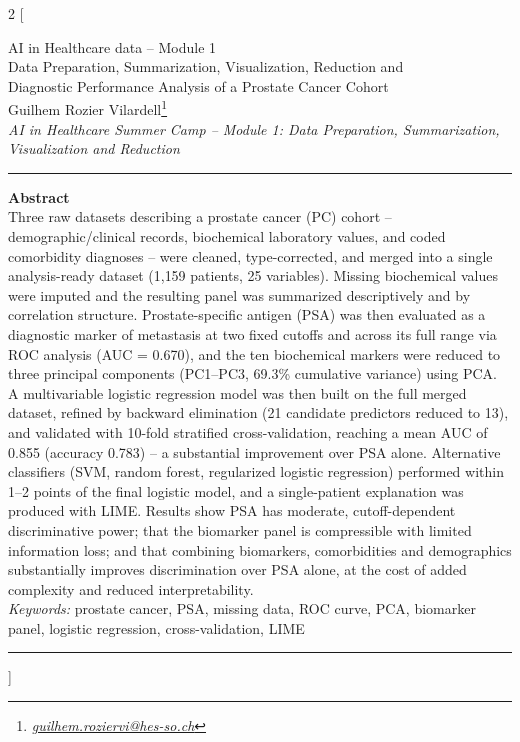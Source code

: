 ﻿\documentclass[a4paper,10pt]{article}
\begin{document}
\begin{multicols*}{2}
[
\begin{center}
\vspace*{0mm}
{\large
AI in Healthcare data -- Module 1\\
\vspace{3mm}
Data Preparation, Summarization, Visualization, Reduction and \\
Diagnostic Performance Analysis of a Prostate Cancer Cohort
}\\
\vspace{8mm}
Guilhem Rozier Vilardell\footnote{\textit{\href{mailto:guilhem.roziervi@hes-so.ch}{guilhem.roziervi@hes-so.ch}}}
\\
\vspace{3mm}
\footnotesize{
\textit{AI in Healthcare Summer Camp -- Module 1: Data Preparation, Summarization, Visualization and Reduction}
}\\
\vspace{9mm}
\end{center}
\rule{\linewidth}{0.4pt}
\onehalfspacing
\textbf{Abstract}\\
Three raw datasets describing a prostate cancer (PC) cohort -- demographic/clinical records, biochemical laboratory values, and coded comorbidity diagnoses -- were cleaned, type-corrected, and merged into a single analysis-ready dataset (1{,}159 patients, 25 variables). Missing biochemical values were imputed and the resulting panel was summarized descriptively and by correlation structure. Prostate-specific antigen (PSA) was then evaluated as a diagnostic marker of metastasis at two fixed cutoffs and across its full range via ROC analysis (AUC = 0.670), and the ten biochemical markers were reduced to three principal components (PC1--PC3, 69.3\% cumulative variance) using PCA. A multivariable logistic regression model was then built on the full merged dataset, refined by backward elimination (21 candidate predictors reduced to 13), and validated with 10-fold stratified cross-validation, reaching a mean AUC of 0.855 (accuracy 0.783) -- a substantial improvement over PSA alone. Alternative classifiers (SVM, random forest, regularized logistic regression) performed within 1--2 points of the final logistic model, and a single-patient explanation was produced with LIME. Results show PSA has moderate, cutoff-dependent discriminative power; that the biomarker panel is compressible with limited information loss; and that combining biomarkers, comorbidities and demographics substantially improves discrimination over PSA alone, at the cost of added complexity and reduced interpretability.\\
\noindent\textit{Keywords:} prostate cancer, PSA, missing data, ROC curve, PCA, biomarker panel, logistic regression, cross-validation, LIME\\
\rule{\linewidth}{0.4pt}
]
\singlespacing


\end{multicols*}
\end{document}
